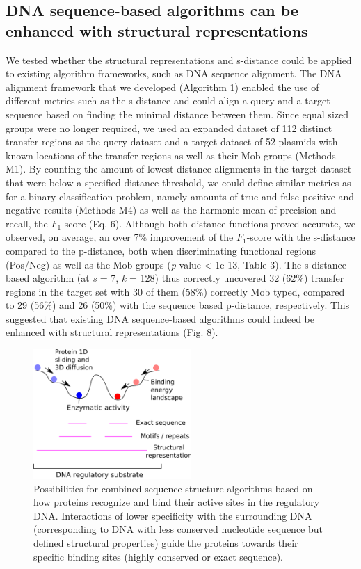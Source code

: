 \documentclass[sigconf]{acmart}
\begin{document}
\subsection{DNA sequence-based algorithms can be enhanced with structural representations}
We tested whether the structural representations and s-distance could be applied to existing algorithm frameworks, such as DNA sequence alignment. The DNA alignment framework that we developed (Algorithm 1) enabled the use of different metrics such as the s-distance and could align a query and a target sequence based on finding the minimal distance between them. Since equal sized groups were no longer required, we used an expanded dataset of 112 distinct transfer regions as the query dataset and a target dataset of 52 plasmids with known locations of the transfer regions as well as their Mob groups \cite{Zrimec2020-wx} (Methods M1). By counting the amount of lowest-distance alignments in the target dataset that were below a specified distance threshold, we could define similar metrics as for a binary classification problem, namely amounts of true and false positive and negative results (Methods M4) as well as the harmonic mean of precision and recall, the $F_1$-score (Eq. 6). Although both distance functions proved accurate, we observed, on average, an over 7\% improvement of the $F_1$-score with the s-distance compared to the p-distance, both when discriminating functional regions (Pos/Neg) as well as the Mob groups (\textit{p}-value < 1e-13, Table 3). The s-distance based algorithm (at \textit{s} = 7, \textit{k} = 128) thus correctly uncovered 32 (62\%) transfer regions in the target set with 30 of them (58\%) correctly Mob typed, compared to 29 (56\%) and 26 (50\%) with the sequence based p-distance, respectively. This suggested that existing DNA sequence-based algorithms could indeed be enhanced with structural representations \cite{Marcovitz2013-kg,Levo2015-iu,Slattery2014-ne,Rohs2009-hm} (Fig. 8).

\begin{figure}[ht]
  \centering
  \includegraphics[width=6cm,keepaspectratio]{smir_fig_algorithms.png}
  \caption{Possibilities for combined sequence structure algorithms based on how proteins recognize and bind their active sites in the regulatory DNA. Interactions of lower specificity with the surrounding DNA (corresponding to DNA with less conserved nucleotide sequence but defined structural properties) guide the proteins towards their specific binding sites (highly conserved or exact sequence).}
\end{figure}
\end{document}
